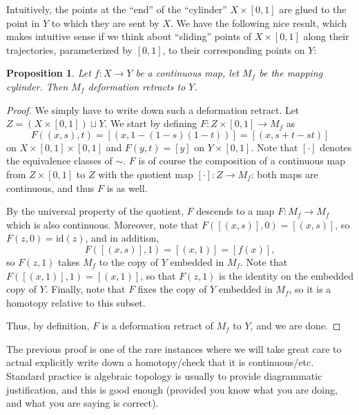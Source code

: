 \documentclass[10pt, oneside]{amsart}
\newtheorem{proposition}{Proposition}
\theoremstyle{definition}
\begin{document}
\noindent Intuitively, the points at the ``end'' of the ``cylinder'' $X \times [0, 1]$ are glued to the point in $Y$ to which they are sent by $X$.
We have the following nice result, which makes intuitive sense if we think about ``sliding'' points of $X \times [0, 1]$ along their trajectories,
parameterized by $[0, 1]$, to their corresponding points on $Y$:

\begin{proposition}
  Let $f : X \rightarrow Y$ be a continuous map, let $M_f$ be the mapping cylinder. Then $M_f$ deformation retracts to $Y$.
\end{proposition}
\begin{proof}
  We simply have to write down such a deformation retract. Let $Z = (X \times [0, 1]) \sqcup Y$. We start by defining $F : Z \times [0, 1] \rightarrow M_f$
  as
  \begin{equation}
    F((x, s), t) = [(x, 1 - (1 - s)(1 - t))] = [(x, s + t - st)]
  \end{equation}
  on $X \times [0, 1] \times [0, 1]$ and $F(y, t) = [y]$ on $Y \times [0, 1]$. Note that $[\cdot]$ denotes the equivalence classes of $\sim$. $F$ is of course the
  composition of a continuous map from $Z \times [0, 1]$ to $Z$ with the quotient map $[\cdot] : Z \rightarrow M_f$: both maps are continuous, and thus $F$ is as well.

  By the universal property of the quotient, $F$ descends to a map $F : M_f \rightarrow M_f$ which is also continuous. Moreover, note that $F([(x, s)], 0) = [(x, s)]$,
  so $F(z, 0) = \text{id}(z)$, and in addition,
  \begin{equation}
    F([(x, s)], 1) = [(x, 1)] = [f(x)],
  \end{equation}
  so $F(z, 1)$ takes $M_f$ to the copy of $Y$ embedded in $M_f$. Note that
  $F([(x, 1)], 1) = [(x, 1)]$, so that $F(z, 1)$ is the identity on the embedded copy of $Y$. Finally, note that $F$
  fixes the copy of $Y$ embedded in $M_f$, so it is a homotopy relative to this subset.

  Thus, by definition, $F$ is a deformation retract of $M_f$ to $Y$, and we are done.
\end{proof}

\noindent The previous proof is one of the rare instances where we will take great care to actual explicitly write down a homotopy/check that it is continuous/etc.
Standard practice is algebraic topology is usually to provide diagrammatic justification, and this is good enough (provided you know what you are doing, and
what you are saying is correct).
\end{document}
